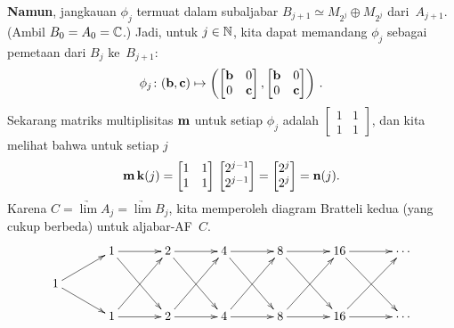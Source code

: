 \begin{exam}
\textbf{Namun}, jangkauan $\phi_j$ termuat dalam subaljabar $B_{j+1} \simeq M_{2^j}
\oplus M_{2^j}$ dari~$A_{j+1}$. (Ambil $B_0 = A_0 = \mathbb{C}$.) Jadi, untuk $j \in \mathbb{N}$, kita dapat memandang
$\phi_j$ sebagai pemetaan dari $B_j$ ke~$B_{j+1}$:
 \[ \phi_j\colon(\mathbf{b}, \mathbf{c}) \mapsto
    \left(\begin{bmatrix} \mathbf{b} & 0 \\ 0 & \mathbf{c} \end{bmatrix},
          \begin{bmatrix} \mathbf{b} & 0 \\ 0 & \mathbf{c} \end{bmatrix}
              \right)\,.\]
Sekarang matriks multiplisitas $\mathbf{m}$ untuk setiap $\phi_j$ adalah $\begin{bmatrix} 1 & 1 \\ 1 & 1
\end{bmatrix}$, dan kita melihat bahwa untuk setiap $j$
 \[\mathbf{m}\, \mathbf{k}(j) =
   \begin{bmatrix} 1 & 1 \\ 1 & 1 \end{bmatrix}\,
        \begin{bmatrix} 2^{j-1} \\ 2^{j-1} \end{bmatrix} =
   \begin{bmatrix} 2^j \\ 2^j \end{bmatrix} = \mathbf{n}(j).\]
Karena $C = \underrightarrow{\lim}A_j = \underrightarrow{\lim}B_j$, kita memperoleh diagram Bratteli kedua
(yang cukup berbeda) untuk aljabar-AF~$C$.
   \[\xymatrix@-10pt{&& 1 \ar[rr]\ar[rrdd] && 2 \ar[rr]\ar[rrdd] && 4 \ar[rr]\ar[rrdd]
                                && 8 \ar[rr]\ar[rrdd] && 16 \ar[rr]\ar[rrdd]&& \cdots\\
              1 \ar[urr]\ar[drr]&&&&&&&&&&  \\
             && 1 \ar[rr]\ar[rruu] && 2 \ar[rr]\ar[rruu] && 4 \ar[rr]\ar[rruu]
                                && 8 \ar[rr]\ar[rruu] && 16 \ar[rr]\ar[rruu]&& \cdots \\
   }\]
\end{exam}

